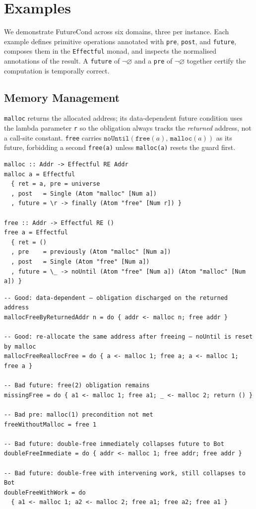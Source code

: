 \documentclass[acmsmall,screen]{acmart}
\newcommand{\noUntil}[2]{\mathtt{noUntil}(#1,\,#2)}
\newcommand{\univ}{\neg\varnothing}
\begin{document}
\section{Examples}
\label{sec:examples}

We demonstrate FutureCond across six domains, three per instance.
Each example defines primitive operations annotated with
\lstinline{pre}, \lstinline{post}, and \lstinline{future},
composes them in the \lstinline{Effectful} monad, and inspects the
normalised annotations of the result.
A \lstinline{future} of $\univ$ and a \lstinline{pre} of $\univ$
together certify the computation is temporally correct.

\subsection{Memory Management}

\lstinline{malloc} returns the allocated address; its data-dependent
future condition uses the lambda parameter \lstinline{r} so the
obligation always tracks the \emph{returned} address, not a
call-site constant.
\lstinline{free} carries $\noUntil{\mathtt{free}(a)}{\mathtt{malloc}(a)}$
as its future, forbidding a second \lstinline{free(a)} unless
\lstinline{malloc(a)} resets the guard first.

\begin{lstlisting}
malloc :: Addr -> Effectful RE Addr
malloc a = Effectful
  { ret = a, pre = universe
  , post   = Single (Atom "malloc" [Num a])
  , future = \r -> finally (Atom "free" [Num r]) }

free :: Addr -> Effectful RE ()
free a = Effectful
  { ret = ()
  , pre    = previously (Atom "malloc" [Num a])
  , post   = Single (Atom "free" [Num a])
  , future = \_ -> noUntil (Atom "free" [Num a]) (Atom "malloc" [Num a]) }
\end{lstlisting}

\begin{lstlisting}
-- Good: data-dependent — obligation discharged on the returned address
mallocFreeByReturnedAddr n = do { addr <- malloc n; free addr }

-- Good: re-allocate the same address after freeing — noUntil is reset by malloc
mallocFreeReallocFree = do { a <- malloc 1; free a; a <- malloc 1; free a }

-- Bad future: free(2) obligation remains
missingFree = do { a1 <- malloc 1; free a1; _ <- malloc 2; return () }

-- Bad pre: malloc(1) precondition not met
freeWithoutMalloc = free 1

-- Bad future: double-free immediately collapses future to Bot
doubleFreeImmediate = do { addr <- malloc 1; free addr; free addr }

-- Bad future: double-free with intervening work, still collapses to Bot
doubleFreeWithWork = do
  { a1 <- malloc 1; a2 <- malloc 2; free a1; free a2; free a1 }
\end{lstlisting}
\end{document}
